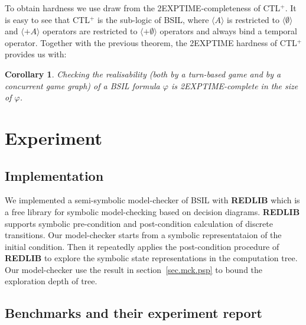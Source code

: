 \documentclass[11pt]{article}
\newtheorem{corollary}[theorem]{Corollary}
\begin{document}
To obtain hardness we use draw from the 2EXPTIME-completeness of CTL$^+$.
It is easy to see that CTL$^+$ is the sub-logic of BSIL, where $\langle A \rangle$ is restricted to $\langle \emptyset \rangle$ and $\langle+A \rangle$ operators are restricted to $\langle+\emptyset \rangle$ operators and always bind a temporal operator.
Together with the previous theorem, the 2EXPTIME hardness of CTL$^+$  \cite{Wilke99} provides us with:

\begin{corollary}
Checking the realisability (both by a turn-based game and by a concurrent game graph) of a BSIL formula $\varphi$ is 2EXPTIME-complete in the size of $\varphi$.
\end{corollary}



\section{Experiment \label{sec.expe}}

\subsection{Implementation} 

We implemented a semi-symbolic model-checker of BSIL with {\bf REDLIB} 
\cite{Wang03,Wang08a,Wang08b,Wang13,Wang14}
which is a free library for symbolic model-checking based on decision diagrams. 
{\bf REDLIB} supports symbolic pre-condition and post-condition calculation 
of discrete transitions.  
Our model-checker starts from a symbolic representataion of the initial 
condition. 
Then it repeatedly applies the post-condition procedure of {\bf REDLIB}
to explore the symbolic state representations in the computation tree.  
Our model-checker use the result in section~\ref{sec.mck.psp} to bound 
the exploration depth of tree.   

\subsection{Benchmarks and their experiment report} 
\end{document}
